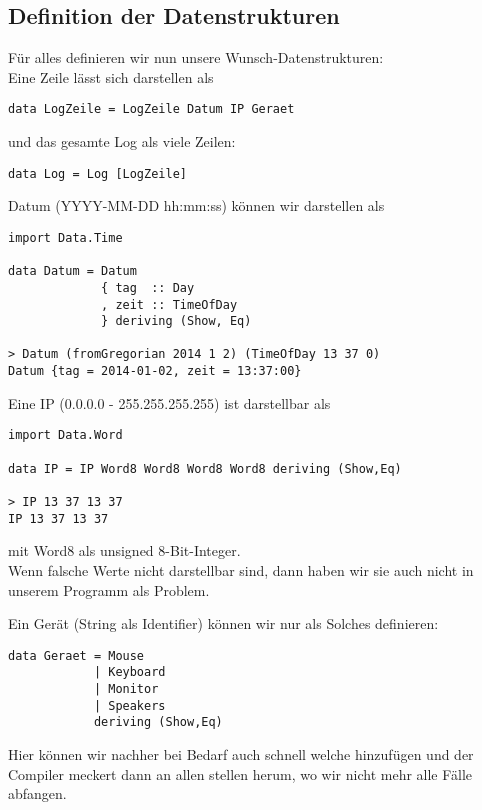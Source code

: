 \documentclass{beamer}
\begin{document}
\subsection{Definition der Datenstrukturen}
\begin{frame}[fragile]
Für alles definieren wir nun unsere Wunsch-Datenstrukturen:\\\pause
\bigskip
Eine Zeile lässt sich darstellen als
\begin{verbatim}
data LogZeile = LogZeile Datum IP Geraet
\end{verbatim}
und das gesamte Log als viele Zeilen:
\begin{verbatim}
data Log = Log [LogZeile]
\end{verbatim}
\end{frame}

\begin{frame}[fragile]
Datum (YYYY-MM-DD hh:mm:ss) können wir darstellen als
\begin{verbatim}
import Data.Time

data Datum = Datum
             { tag  :: Day
             , zeit :: TimeOfDay
             } deriving (Show, Eq)

> Datum (fromGregorian 2014 1 2) (TimeOfDay 13 37 0)
Datum {tag = 2014-01-02, zeit = 13:37:00}
\end{verbatim}

\end{frame}

\begin{frame}[fragile]
Eine IP (0.0.0.0 - 255.255.255.255) ist darstellbar als
\begin{verbatim}
import Data.Word

data IP = IP Word8 Word8 Word8 Word8 deriving (Show,Eq)

> IP 13 37 13 37
IP 13 37 13 37
\end{verbatim}
mit Word8 als unsigned 8-Bit-Integer.\\
\pause
Wenn falsche Werte nicht darstellbar sind, dann haben wir sie auch nicht in unserem Programm als Problem.
\end{frame}

\begin{frame}[fragile]
Ein Gerät (String als Identifier) können wir nur als Solches definieren:
\begin{verbatim}
data Geraet = Mouse 
            | Keyboard 
            | Monitor 
            | Speakers 
            deriving (Show,Eq)
\end{verbatim}
Hier können wir nachher bei Bedarf auch schnell welche hinzufügen und der Compiler meckert dann an allen stellen herum, wo wir nicht mehr alle Fälle abfangen.
\end{frame}
\end{document}
